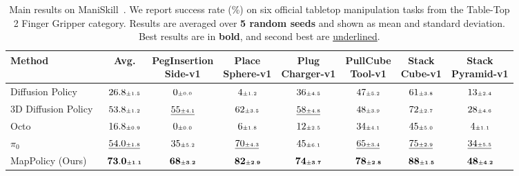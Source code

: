 \begin{table}[t]
\centering
\caption{Main results on ManiSkill~\cite{Gu2023ManiSkill2}. We report success rate (\%) on six official tabletop manipulation tasks from the Table-Top 2 Finger Gripper category. Results are averaged over \textbf{5 random seeds} and shown as mean and standard deviation. Best results are in \textbf{bold}, and second best are \underline{underlined}.}
\label{tab:main_results_maniskill}
\small
\setlength{\tabcolsep}{5pt}
\begin{adjustbox}{max width=0.95\textwidth}
\begin{tabular}{l|c|cccccc}
\toprule
\rowcolor{tablehead}
Method & Avg. &
\shortstack{PegInsertion\\Side-v1} &
\shortstack{Place\\Sphere-v1} &
\shortstack{Plug\\Charger-v1} &
\shortstack{PullCube\\Tool-v1} &
\shortstack{Stack\\Cube-v1} &
\shortstack{Stack\\Pyramid-v1} \\
\midrule
Diffusion Policy~\cite{chi2024diffusionpolicy} & $26.8{\scriptscriptstyle\pm 1.5}$ & $0{\scriptscriptstyle\pm 0.0}$ & $4{\scriptscriptstyle\pm 1.2}$ & $36{\scriptscriptstyle\pm 4.5}$ & $47{\scriptscriptstyle\pm 5.2}$ & $61{\scriptscriptstyle\pm 3.8}$ & $13{\scriptscriptstyle\pm 2.4}$ \\
3D Diffusion Policy~\cite{Ze2024DP3} & $53.8{\scriptscriptstyle\pm 1.2}$ & $\underline{55{\scriptscriptstyle\pm 4.1}}$ & $62{\scriptscriptstyle\pm 3.5}$ & $\underline{58{\scriptscriptstyle\pm 4.8}}$ & $48{\scriptscriptstyle\pm 3.9}$ & $72{\scriptscriptstyle\pm 2.7}$ & $28{\scriptscriptstyle\pm 4.6}$ \\
Octo~\cite{octo_2023} & $16.8{\scriptscriptstyle\pm 0.9}$ & $0{\scriptscriptstyle\pm 0.0}$ & $6{\scriptscriptstyle\pm 1.8}$ & $12{\scriptscriptstyle\pm 2.5}$ & $34{\scriptscriptstyle\pm 4.1}$ & $45{\scriptscriptstyle\pm 5.0}$ & $4{\scriptscriptstyle\pm 1.1}$ \\
$\pi_0$~\cite{black2026pi0visionlanguageactionflowmodel} & $\underline{54.0{\scriptscriptstyle\pm 1.8}}$ & $35{\scriptscriptstyle\pm 5.2}$ & $\underline{70{\scriptscriptstyle\pm 4.3}}$ & $45{\scriptscriptstyle\pm 6.1}$ & $\underline{65{\scriptscriptstyle\pm 3.4}}$ & $\underline{75{\scriptscriptstyle\pm 2.9}}$ & $\underline{34{\scriptscriptstyle\pm 5.5}}$ \\
\midrule
MapPolicy (Ours) & $\mathbf{73.0{\scriptscriptstyle\pm 1.1}}$ & $\mathbf{68{\scriptscriptstyle\pm 3.2}}$ & $\mathbf{82{\scriptscriptstyle\pm 2.9}}$ & $\mathbf{74{\scriptscriptstyle\pm 3.7}}$ & $\mathbf{78{\scriptscriptstyle\pm 2.8}}$ & $\mathbf{88{\scriptscriptstyle\pm 1.5}}$ & $\mathbf{48{\scriptscriptstyle\pm 4.2}}$ \\
\bottomrule
\end{tabular}
\end{adjustbox}
\end{table}
